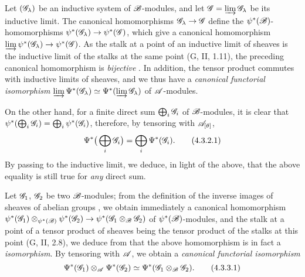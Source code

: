 \begin{env}[4.3.2]
\label{0.4.3.2}
Let $(\mathscr{G}_\lambda)$ be an inductive system of $\mathscr{B}$-modules, and let
$\mathscr{G}=\varinjlim\mathscr{G}_\lambda$ be its inductive limit. The canonical
homomorphisms $\sh{G}_\lambda\to\sh{G}$ define the
$\psi^*(\mathscr{B})$-homomorphisms $\psi^*(\sh{G}_\lambda)\to\psi^*(\sh{G})$, which
give a canonical homomorphism
$\varinjlim\psi^*(\sh{G}_\lambda)\to\psi^*(\sh{G})$. As the stalk at a point of
an inductive limit of sheaves is the inductive limit of the stalks at the same
point (G, II, 1.11), the preceding canonical homomorphism is \emph{bijective}
. In addition, the tensor product commutes with inductive
limits of sheaves, and we thus have a \emph{canonical functorial isomorphism}
$\varinjlim\Psi^*(\mathscr{G}_\lambda)\simeq\Psi^*(\varinjlim\mathscr{G}_\lambda)$ of
$\mathscr{A}$-modules.

On the other hand, for a finite direct sum $\bigoplus_i\mathscr{G}_i$ of
$\mathscr{B}$-modules, it is clear that
$\psi^*(\bigoplus_i\mathscr{G}_i)=\bigoplus_i\psi^*(\mathscr{G}_i)$, therefore, by
tensoring with $\mathscr{A}_{[\theta]}$,
\[
  \Psi^*\big(\bigoplus_i\mathscr{G}_i\big)=\bigoplus_i\Psi^*(\mathscr{G}_i).
  \tag{4.3.2.1}
\]
By passing to the inductive limit, we deduce, in light of the above, that the
above equality is still true for \emph{any} direct sum.
\end{env}

\begin{env}[4.3.3]
\label{0.4.3.3}
Let $\mathscr{G}_1$, $\mathscr{G}_2$ be two $\mathscr{B}$-modules; from the definition of the
inverse images of sheaves of abelian groups , we obtain
immediately a canonical homomorphism
$\psi^*(\sh{G}_1)\otimes_{\psi^*(\sh{B})}\psi^*(\sh{G}_2)
  \to\psi^*(\sh{G}_1\otimes_\sh{B}\sh{G}_2)$ of $\psi^*(\mathscr{B})$-modules, and
the stalk at a point of a tensor product of sheaves being the tensor product of
the stalks at this point (G, II, 2.8), we deduce from  that the
above homomorphism is in fact a \emph{isomorphism}. By tensoring with $\mathscr{A}$,
we obtain a \emph{canonical functorial isomorphism}
\[
  \Psi^*(\mathscr{G}_1)\otimes_\mathscr{A}\Psi^*(\mathscr{G}_2)
  \simeq\Psi^*(\mathscr{G}_1\otimes_\mathscr{B}\mathscr{G}_2).
  \tag{4.3.3.1}
\]
\end{env}

